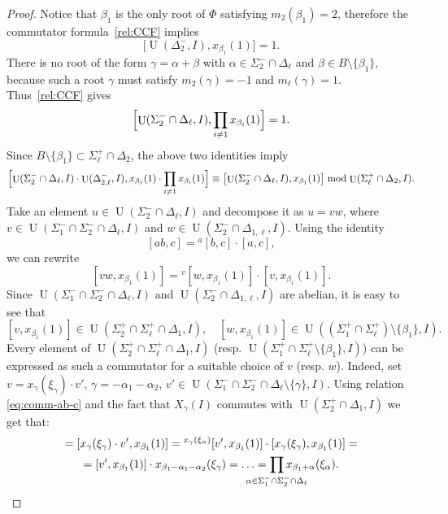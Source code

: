 \documentclass[oneside, 12pt]{amsart}
\theoremstyle{plain}
\numberwithin{equation}{section}
\numberwithin{lemma}{section}
\theoremstyle{definition}
\theoremstyle{remark}
\DeclareMathOperator{\U}{U}
\begin{document}
\begin{proof}
Notice that $\beta_1$ is the only root of $\Phi$ satisfying $m_2(\beta_1)=2$, therefore the commutator formula~\eqref{rel:CCF} implies
\[ \bigl[\U(\Delta_2^-, I), x_{\beta_1}(1)\bigr]=1. \]
There is no root of the form $\gamma=\alpha+\beta$ with $\alpha\in\Sigma_2^-\cap\Delta_\ell$ and $\beta\in B\setminus\{\beta_1\}$, because such a root $\gamma$ must satisfy $m_2(\gamma)=-1$ and $m_\ell(\gamma)=1$. Thus~\eqref{rel:CCF} gives
\[\Bigl[\U(\Sigma_2^-\cap\Delta_\ell, I), \prod_{i\neq1}x_{\beta_i}(1)\Bigr]=1. \]
Since $B\setminus\{\beta_1\}\subset\Sigma_\ell^+\cap\Delta_2$, the above two identities imply
\[ \Bigl[ \U(\Sigma_2^-\cap\Delta_\ell, I)\cdot\U(\Delta_{2, \ell}^-, I), x_{\beta_1}(1)\cdot\prod_{i\neq1}x_{\beta_i}(1) \Bigr] \equiv \bigl[ \U(\Sigma_2^-\cap\Delta_\ell, I), x_{\beta_1}(1) \bigr] \bmod \U(\Sigma_\ell^+\cap\Delta_2, I). \]
Take an element $u\in\U(\Sigma_2^-\cap\Delta_\ell, I)$ and decompose it as $u=vw$, where $v\in\U(\Sigma_1^-\cap\Sigma_2^-\cap\Delta_\ell, I)$ and $w\in\U(\Sigma_2^-\cap\Delta_{1, \ell}, I)$.
Using the identity
\begin{equation}\label{eq:comm-ab-c}
[ab, c]={}^a[b, c]\cdot[a, c], 
\end{equation}
we can rewrite
\[ [vw, x_{\beta_1}(1)] = {}^v[w, x_{\beta_1}(1)]\cdot[v, x_{\beta_1}(1)].  \]
Since $\U(\Sigma_1^-\cap\Sigma_2^-\cap\Delta_\ell, I)$ and $\U(\Sigma_2^-\cap\Delta_{1, \ell}, I)$ are abelian, it is easy to see that
\[ [v, x_{\beta_1}(1)]\in\U(\Sigma_2^+\cap\Sigma_\ell^+\cap\Delta_1, I), \quad [w, x_{\beta_1}(1)]\in\U((\Sigma_1^+\cap\Sigma_\ell^+)\setminus\{\beta_1\}, I). \]
Every element of $\U(\Sigma_2^+\cap\Sigma_\ell^+\cap\Delta_1, I)$ (resp. $\U(\Sigma_1^+\cap\Sigma_\ell^+\setminus\{\beta_1\}, I)$) can be expressed as such a commutator for a suitable choice of $v$ (resp. $w$).
Indeed, set $v=x_\gamma(\xi_\gamma)\cdot v'$, $\gamma=-\alpha_1-\alpha_2$, $v' \in \U(\Sigma_1^- \cap \Sigma_2^- \cap \Delta_\ell \setminus \{\gamma\}, I)$.
Using relation \eqref{eq:comm-ab-c} and the fact that $X_\gamma(I)$ commutes with $\U(\Sigma_2^+\cap\Delta_1, I)$ we get that:
\begin{multline*}
[v, x_{\beta_1}(1)] = [x_\gamma(\xi_\gamma)\cdot v', x_{\beta_1}(1)] = {}^{x_\gamma(\xi_\alpha)}[v', x_{\beta_1}(1)] \cdot [x_\gamma(\xi_\gamma), x_{\beta_1}(1)] = \\
= [v', x_{\beta_1}(1)]\cdot x_{\beta_1-\alpha_1-\alpha_2}(\xi_\gamma) = \ldots = \prod_{\mathclap{\alpha\in\Sigma_1^- \cap \Sigma_2^- \cap \Delta_\ell}} x_{\beta_1+\alpha}(\xi_\alpha).
 \end{multline*}

\end{proof}
\end{document}
